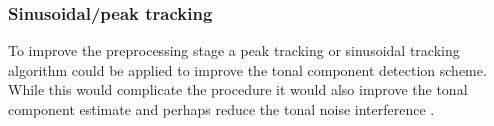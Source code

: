 \subsubsection{Sinusoidal/peak tracking}
To improve the preprocessing stage a peak tracking or sinusoidal tracking algorithm could be applied to improve the tonal component detection scheme. While this would complicate the procedure it would also improve the tonal component estimate and perhaps reduce the tonal noise interference \cite{McAulay1986}.



